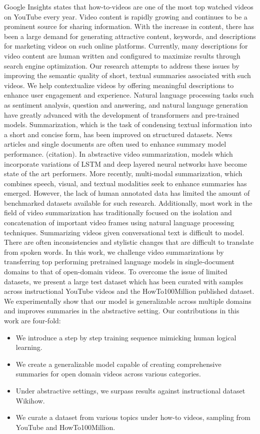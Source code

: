 \documentclass{article}
\begin{document}
Google Insights states that how-to-videos are one of the most top watched videos on YouTube every year. Video content is rapidly growing and continues to be a prominent source for sharing information. With the increase in content, there has been a large demand for generating attractive content, keywords, and descriptions for marketing videos on such online platforms. Currently, many descriptions for video content are human written and configured to maximize results through search engine optimization. Our research attempts to address these issues by improving the semantic quality of short, textual summaries associated with such videos. We help contextualize videos by offering meaningful descriptions to enhance user engagement and experience.
Natural language processing tasks such as sentiment analysis, question and answering, and natural language generation have greatly advanced with the development of transformers and pre-trained models. Summarization, which is the task of condensing textual information into a short and concise form, has been improved on structured datasets. News articles and single documents are often used to enhance summary model performance. (citation). In abstractive video summarization, models which incorporate variations of LSTM and deep layered neural networks have become state of the art performers. More recently, multi-modal summarization, which combines speech, visual, and textual modalities seek to enhance summaries has emerged. However, the lack of human annotated data has limited the amount of benchmarked datasets available for such research. Additionally, most work in the field of video summarization has traditionally focused on the isolation and concatenation of important video frames using natural language processing techniques. Summarizing videos given conversational text is difficult to model. There are often inconsistencies and stylistic changes that are difficult to translate from spoken words. 
In this work, we challenge video summarizations by transferring top performing pretrained language models in single-document domains to that of open-domain videos. To overcome the issue of limited datasets, we present a large test dataset which has been curated with samples across instructional YouTube videos and the HowTo100Million published dataset. We experimentally show that our model is generalizable across multiple domains and improves summaries in the abstractive setting. Our contributions in this work are four-fold:

\begin{itemize}

\item We introduce a step by step training sequence mimicking human logical learning.
\item We create a generalizable model capable of creating comprehensive summaries for open domain videos across various categories. 
\item Under abstractive settings, we surpass results against instructional dataset Wikihow.
\item  We curate a dataset from various topics under how-to videos, sampling from YouTube and HowTo100Million. 

\end{itemize}
\end{document}
